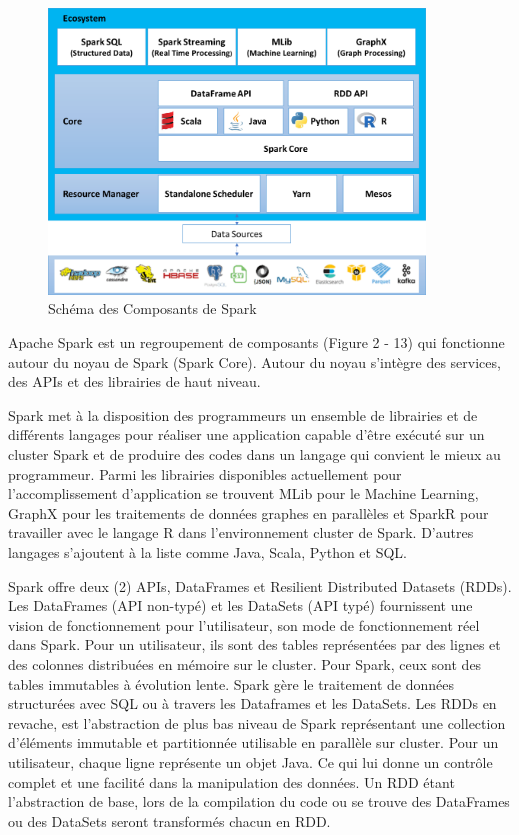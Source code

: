 \documentclass[12pt,french]{book}
\begin{document}
\begin{figure}[h]
	\centering
	\includegraphics[width=10cm]{sparkSchema}
	\caption{Schéma des Composants de Spark}
\end{figure}

Apache Spark est un regroupement de composants (Figure 2 - 13) qui fonctionne autour du noyau de Spark (Spark Core).
Autour du noyau s’intègre des services, des APIs et des librairies de haut niveau.

Spark met à la disposition des programmeurs un ensemble de librairies et de différents langages pour réaliser une application capable d’être exécuté sur un cluster Spark et de produire des codes dans un langage qui convient le mieux au programmeur.
Parmi les librairies disponibles actuellement pour l’accomplissement d’application se trouvent MLib pour le Machine Learning, GraphX pour les traitements de données graphes en parallèles et SparkR pour travailler avec le langage R dans l’environnement cluster de Spark.
D’autres langages s’ajoutent à la liste comme Java, Scala, Python et SQL.

Spark offre deux (2) APIs, DataFrames et Resilient Distributed Datasets (RDDs). Les DataFrames (API non-typé) et les DataSets (API typé) fournissent une vision de fonctionnement pour l’utilisateur, son mode de fonctionnement réel dans Spark.
Pour un utilisateur, ils sont des tables représentées par des lignes et des colonnes distribuées en mémoire sur le cluster.
Pour Spark, ceux sont des tables immutables à évolution lente.
Spark gère le traitement de données structurées avec SQL ou à travers les Dataframes et les DataSets.
Les RDDs en revache, est l’abstraction de plus bas niveau de Spark représentant une collection d’éléments immutable et partitionnée utilisable en parallèle sur cluster.
Pour un utilisateur, chaque ligne représente un objet Java.
Ce qui lui donne un contrôle complet et une facilité dans la manipulation des données.
Un RDD étant l’abstraction de base, lors de la compilation du code ou se trouve des DataFrames ou des DataSets seront transformés chacun en RDD.
\end{document}
